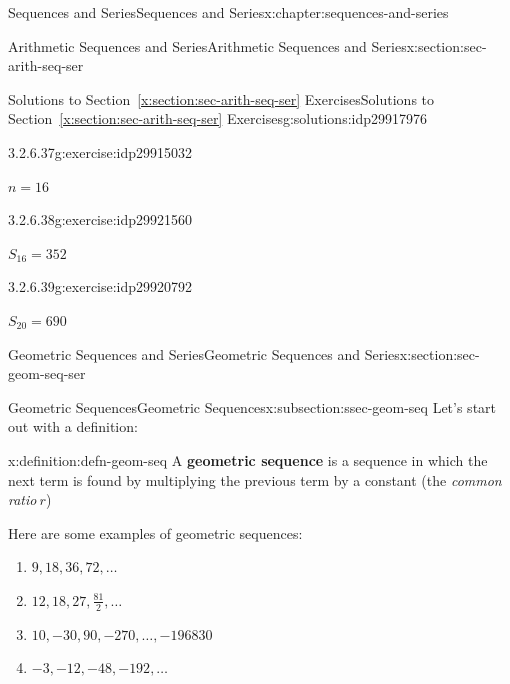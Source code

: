 \documentclass[twoside,10pt,]{book}
\newcommand{\xreffont}{\relax}
\newcommand{\terminology}[1]{\textbf{#1}}
\numberwithin{equation}{section}
\begin{document}
\begin{chapterptx}{Sequences and Series}{}{Sequences and Series}{}{}{x:chapter:sequences-and-series}
\begin{sectionptx}{Arithmetic Sequences and Series}{}{Arithmetic Sequences and Series}{}{}{x:section:sec-arith-seq-ser}
\begin{solutions-subsection}{Solutions to Section~{\xreffont\ref*{x:section:sec-arith-seq-ser}} Exercises}{}{Solutions to Section~{\xreffont\ref*{x:section:sec-arith-seq-ser}} Exercises}{}{}{g:solutions:idp29917976}
\begin{exercisegroup}
\end{exercisegroup}
\par\medskip\noindent
\begin{divisionsolution}{3.2.6.37}{}{g:exercise:idp29915032}%
\par\smallskip%
\noindent\hypertarget{g:solution:idp29920920-main}{}\(n=16\)\end{divisionsolution}%
\begin{divisionsolution}{3.2.6.38}{}{g:exercise:idp29921560}%
\par\smallskip%
\noindent\hypertarget{g:solution:idp29919128-main}{}\(S_{16} = 352\)\end{divisionsolution}%
\begin{divisionsolution}{3.2.6.39}{}{g:exercise:idp29920792}%
\par\smallskip%
\noindent\hypertarget{g:solution:idp29917848-main}{}\(S_{20} = 690\)\end{divisionsolution}%
\end{solutions-subsection}
\end{sectionptx}
%
%
\typeout{************************************************}
\typeout{************************************************}
%
\begin{sectionptx}{Geometric Sequences and Series}{}{Geometric Sequences and Series}{}{}{x:section:sec-geom-seq-ser}
%
%
\typeout{************************************************}
\typeout{************************************************}
%
\begin{subsectionptx}{Geometric Sequences}{}{Geometric Sequences}{}{}{x:subsection:ssec-geom-seq}
Let's start out with a definition: \begin{definition}{}{x:definition:defn-geom-seq}%
A \terminology{geometric sequence} is a sequence in which the next term is found by multiplying the previous term by a constant (the \emph{common ratio}\(\ r\))\end{definition}
%
\par
Here are some examples of geometric sequences:%
\begin{enumerate}[label=(\alph*)]
\item{}\(\displaystyle 9, 18, 36, 72, \ldots\)%
\item{}\(\displaystyle 12, 18, 27, \frac{81}{2},\ldots\)%
\item{}\(\displaystyle 10, -30, 90, -270, \ldots,  -196830\)%
\item{}\(\displaystyle -3, -12, -48, -192, \ldots\)%

\end{enumerate}
\end{subsectionptx}
\end{sectionptx}
\end{chapterptx}
\end{document}
